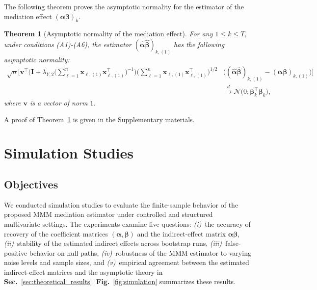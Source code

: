 \documentclass[
  12pt]{article}
\newtheorem{thm}{Theorem}[section]
\def\X{\mathbf{x}}
\begin{document}
The following theorem proves the asymptotic normality for the estimator of the mediation effect $(\bm{\alpha} \bm{\beta})_{k}$.
\begin{thm}[Asymptotic normality of the mediation effect]\label{thm:asymptotic.normality.elastic.net.estimator:alpha.beta_k}
	For any $1 \leq  k  \leq  T$, under conditions \textrm{(A1)-(A6)}, the estimator $(\widehat{\bm{\alpha}}  \widehat{\bm{\beta}})_{k,(1)}$ has the following asymptotic normality:
	\begin{align*}
		\sqrt{n}  \Big[   \mathbf{v}^{\top}  \Big( \mathbf{I} +  \lambda_{Y,2} \big(  \sum_{\ell = 1}^{n}   \X_{\ell , (1)} \X_{\ell , (1)}^{\top} \big)^{-1}\Big) \Big( \sum_{\ell = 1}^{n}    \X_{\ell , (1)} \X_{\ell , (1)}^{\top} \Big)^{1/2}  & \Big( (\widehat{\bm{\alpha}}  \widehat{\bm{\beta}})_{k,(1)} - (\bm{\alpha} \bm{\beta})_{k,(1)} \Big)   \Big]
		\\
		&\overset{ d }{\longrightarrow} \mathcal{N} \big(0 ; \bm{\beta}_k^{\top}  \bm{\beta}_k \big),
	\end{align*}
where $\bm {v}$ is a vector of norm $1$.
\end{thm}
\noindent
A proof of Theorem~\ref{thm:asymptotic.normality.elastic.net.estimator:alpha.beta_k} is given in the Supplementary materials.  %


\section{Simulation Studies}
\label{sec:simulation}

\subsection{Objectives}

We conducted simulation studies to evaluate the finite-sample behavior of the proposed MMM mediation estimator under controlled and structured multivariate settings.
The experiments examine five questions:
\textit{(i)}~the accuracy of recovery of the coefficient matrices $(\bm{\alpha},\bm{\beta})$ and the indirect-effect matrix $\bm{\alpha}\bm{\beta}$,
\textit{(ii)}~stability of the estimated indirect effects across bootstrap runs,
\textit{(iii)}~false-positive behavior on null paths,
\textit{(iv)}~robustness of the MMM estimator to varying noise levels and sample sizes,
and \textit{(v)}~empirical agreement between the estimated indirect-effect matrices and the asymptotic theory in \textbf{Sec.}~\ref{sec:theoretical_results}.
\textbf{Fig.}~\ref{fig:simulation} summarizes these results.
\end{document}
